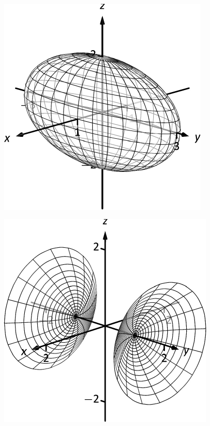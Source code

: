 \documentclass[10pt]{article}
\begin{document}
\includegraphics{fig10_01_ex_21_3DBW.pdf}
\texttt{}

\includegraphics{fig10_01_ex_22_3DBW.pdf}
\texttt{}
\end{document}
